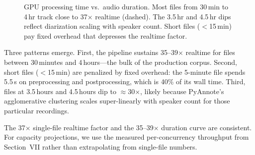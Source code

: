 \documentclass[conference,10pt]{IEEEtran}
\begin{document}
\begin{figure}[!t]
\centering
{}
\caption{GPU processing time vs.\ audio duration. Most files from 30\,min to
  4\,hr track close to 37$\times$ realtime (dashed). The 3.5\,hr and 4.5\,hr
  dips reflect diarization scaling with speaker count. Short files
  ($<$15\,min) pay fixed overhead that depresses the realtime factor.}
\label{fig:duration}
\end{figure}

Three patterns emerge. First, the pipeline sustains 35--39$\times$ realtime for
files between 30\,minutes and 4\,hours---the bulk of the production corpus.
Second, short files ($<$15\,min) are penalized by fixed overhead: the 5-minute
file spends 5.5\,s on preprocessing and postprocessing, which is 40\% of its
wall time. Third, files at 3.5\,hours and 4.5\,hours dip to $\approx$30$\times$,
likely because PyAnnote's agglomerative clustering scales super-linearly with
speaker count for those particular recordings.

The 37$\times$ single-file realtime factor and the 35--39$\times$ duration
curve are consistent. For capacity projections, we use the measured per-concurrency
throughput from Section~VII rather than extrapolating from single-file numbers.
\end{document}
